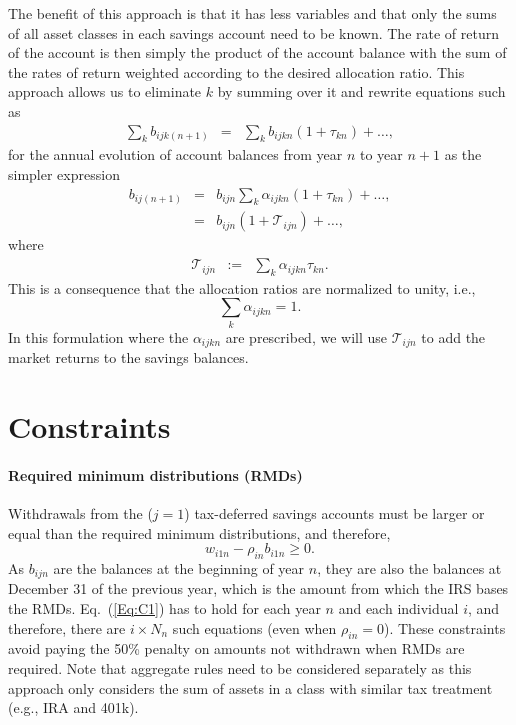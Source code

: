 \documentclass{report}[fleqn,11pt]
\begin{document}
The benefit of this approach is that it has less variables and that only the sums of
all asset classes in each savings account need to be known. The rate of return
of the account is then simply the product of the account balance with the sum of
the rates of return weighted according to the desired allocation ratio.
This approach allows us to eliminate $k$ by summing over it and rewrite
equations such as
\begin{eqnarray}
	\sum_k b_{ijk(n+1)} &=& \sum_k b_{ijkn} (1 + \tau_{kn}) + \ldots ,
\end{eqnarray}
for the annual evolution of account balances from year $n$ to year $n+1$
as the simpler expression 
\begin{eqnarray}
	b_{ij(n+1)} &=& b_{ijn} \sum_k \alpha_{ijkn} (1 + \tau_{kn}) + \ldots ,\nonumber \\
		  &=& b_{ijn} (1 + \mathcal{T}_{ijn}) + \ldots ,
\end{eqnarray}
where
\begin{eqnarray}
	\label{Eq:Tau1}
	\mathcal{T}_{ijn} &:=& \sum_k \alpha_{ijkn} \tau_{kn}.
\end{eqnarray}
This is a consequence that the allocation ratios are normalized to unity, i.e.,
\begin{equation}
	\sum_k \alpha_{ijkn} = 1.
\end{equation}
In this formulation where the $\alpha_{ijkn}$ are prescribed,
we will use $\mathcal{T}_{ijn}$ to
add the market returns to the savings balances.

\section{Constraints}
\paragraph*{Required minimum distributions (RMDs)}
	Withdrawals from the ($j=1$) tax-deferred savings accounts must be larger
	or equal than the required minimum distributions, and therefore,
	\begin{equation}
		\label{Eq:C1}
		w_{i1n} -  \rho_{in}b_{i1n} \geq 0.
	\end{equation}
	As $b_{ijn}$ are the balances at the beginning of year $n$, they are also the balances
	at December 31 of the previous year, which is the amount from which the IRS bases the RMDs.
	Eq.~(\ref{Eq:C1}) has to hold for each year $n$ and each individual $i$, and therefore, there
	are $i\times N_n$ such equations (even when $\rho_{in} = 0$).
	These constraints avoid paying the 50\% penalty
	on amounts not withdrawn when RMDs are required.
	Note that aggregate rules need to be considered separately as this approach only considers
	the sum of assets in a class with similar tax treatment (e.g., IRA and 401k).
\end{document}
